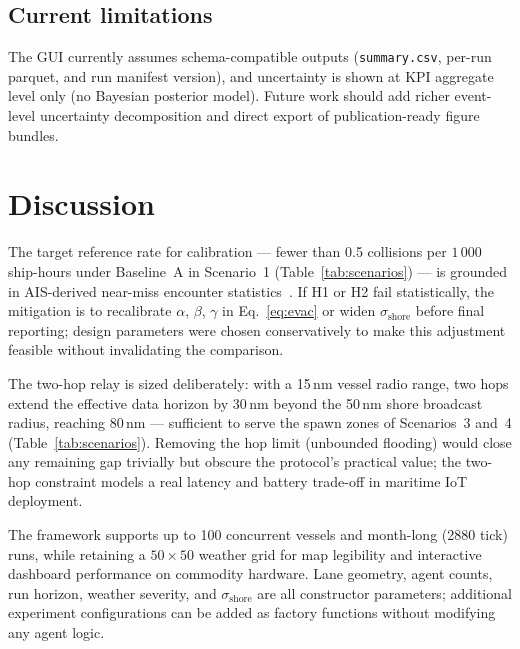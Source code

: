 \documentclass[cameraready]{Interspeech}
\begin{document}
\subsection{Current limitations}
The GUI currently assumes schema-compatible outputs (\texttt{summary.csv}, per-run parquet, and run manifest version), and uncertainty is shown at KPI aggregate level only (no Bayesian posterior model). Future work should add richer event-level uncertainty decomposition and direct export of publication-ready figure bundles.

\section{Discussion}
\label{sec:discussion}

The target reference rate for calibration — fewer than 0.5 collisions per $1\,000$ ship-hours under Baseline~A in Scenario~1 (Table~\ref{tab:scenarios}) — is grounded in AIS-derived near-miss encounter statistics~\cite{silveira2013}. If H1 or H2 fail statistically, the mitigation is to recalibrate $\alpha$, $\beta$, $\gamma$ in Eq.~\ref{eq:evac} or widen $\sigma_\text{shore}$ before final reporting; design parameters were chosen conservatively to make this adjustment feasible without invalidating the comparison.

The two-hop relay is sized deliberately: with a 15\,nm vessel radio range, two hops extend the effective data horizon by 30\,nm beyond the 50\,nm shore broadcast radius, reaching 80\,nm — sufficient to serve the spawn zones of Scenarios~3 and~4 (Table~\ref{tab:scenarios}). Removing the hop limit (unbounded flooding) would close any remaining gap trivially but obscure the protocol's practical value; the two-hop constraint models a real latency and battery trade-off in maritime IoT deployment.

The framework supports up to 100 concurrent vessels and month-long (2880 tick) runs, while retaining a $50 \times 50$ weather grid for map legibility and interactive dashboard performance on commodity hardware. Lane geometry, agent counts, run horizon, weather severity, and $\sigma_\text{shore}$ are all constructor parameters; additional experiment configurations can be added as factory functions without modifying any agent logic.



\end{document}
